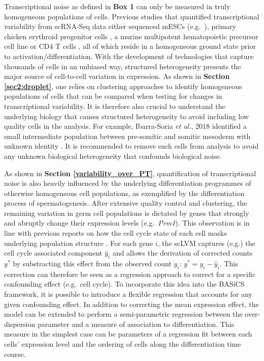 Transcriptional noise as defined in \textbf{Box 1} can only be measured in truly homogeneous populations of cells. Previous studies that quantified transcriptional variability from scRNA-Seq data either sequenced mESCs (e.g.~\citep{Kolodziejczyk2015cell}), primary chicken erythroid progenitor cells \citep{Richard2016}, a murine multipotent hematopoietic precursor cell line \citep{Mojtahedi2016} or CD4\plus{} T cells \citep{Martinez-jimenez2017}, all of which reside in a homogeneous ground state prior to activation/differentiation. With the development of technologies that capture thousands of cells in an unbiased way, structured heterogeneity presents the major source of cell-to-cell variation in expression. As shown in \textbf{Section \ref{sec2:droplet}}, one relies on clustering approaches to identify homogeneous populations of cells that can be compared when testing for changes in transcriptional variability. It is therefore also crucial to understand the underlying biology that causes structured heterogeneity to avoid including low quality cells in the analysis. For example, Ibarra-Soria \emph{et al.}, 2018 identified a small intermediate population between pre-somitic and somitic mesoderm with unknown identity \citep{Ibarra-Soria2018}. It is recommended to remove such cells from analysis to avoid any unknown biological heterogeneity that confounds biological noise.

\newpage
 
As shown in \textbf{Section \ref{variability_over_PT}}, quantification of transcriptional noise is also heavily influenced by the underlying differentiation programmes of otherwise homogeneous cell populations, as exemplified by the differentiation process of spermatogenesis. After extensive quality control and clustering, the remaining variation in germ cell populations is dictated by genes that strongly and abruptly change their expression levels (e.g.~\textit{Prm1}). This observation is in line with previous reports on how the cell cycle state of each cell masks underlying population structure \citep{Buettner2015}. For each gene $i$, the \gls{scLVM} captures (e.g.) the cell cycle associated component $\hat{y}_i$ and allows the derivation of corrected counts $y^{\ast}$ by substracting this effect from the observed count $y_i$: $y^{\ast}=y_i-\hat{y}_i$. This correction can therefore be seen as a regression approach to correct for a specific confounding effect (e.g.~cell cycle). To incorporate this idea into the BASiCS framework, it is possible to introduce a flexible regression that accounts for any given confounding effect. In addition to correcting the mean expression effect, the model can be extended to perform a semi-parametric regression between the over-dispersion parameter and a measure of association to differentiation. This measure in the simplest case can be parameters of a regression fit between each cells' expression level and the ordering of cells along the differentiation time course. 

